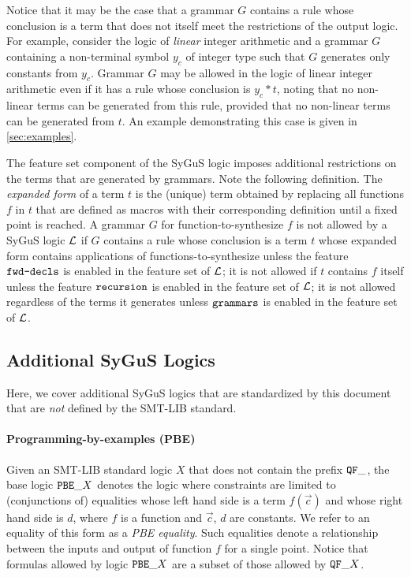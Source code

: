 \documentclass[english,a4paper,10pt]{article}
\begin{document}
Notice that it may be the case that a grammar $G$
contains a rule whose conclusion is a term 
that does not itself meet the restrictions 
of the output logic.
For example, consider the logic of \emph{linear} integer arithmetic
and a grammar $G$ containing a non-terminal symbol $y_c$ of integer type
such that $G$ generates only constants from $y_c$.
Grammar $G$ may be allowed in the logic of linear integer arithmetic
even if it has a rule whose conclusion is $y_c * t$, 
noting that no non-linear terms can be generated from this rule,
provided that no non-linear terms can be generated from $t$.
An example demonstrating this case is given in \cref{sec:examples}.

The feature set component of the SyGuS logic 
imposes additional restrictions
on the terms that are generated by grammars.
Note the following definition.
The \emph{expanded form} of a term $t$
is the (unique) term obtained
by replacing all functions $f$ in $t$ that are defined as macros
with their corresponding definition until a fixed point is reached.
A grammar $G$ for function-to-synthesize $f$ is not allowed by a SyGuS logic $\mathcal{L}$
if $G$  contains a rule whose conclusion is a term $t$
whose expanded form contains applications of functions-to-synthesize
unless the feature $\texttt{fwd-decls}$ is enabled in the feature set of $\mathcal{L}$;
it is not allowed if $t$ 
contains $f$ itself unless the feature $\texttt{recursion}$ is enabled in the feature set of $\mathcal{L}$;
it is not allowed regardless of the terms it generates unless $\texttt{grammars}$ is enabled in the feature set of $\mathcal{L}$.


\subsection{Additional SyGuS Logics}
Here, we cover additional SyGuS logics that are standardized
by this document that are \emph{not} defined by the SMT-LIB standard.

\paragraph{Programming-by-examples (PBE)}
Given an SMT-LIB standard logic $X$ 
that does not contain the prefix ${\tt QF\_}$,
the base logic ${\tt PBE\_}X$ denotes the logic
where constraints are limited to (conjunctions of)
equalities whose left hand side is a term $f( \vec c )$ and 
whose right hand side is $d$,
where $f$ is a function
and $\vec c$, $d$ are constants.
We refer to an equality of this form as a \emph{PBE equality}.
Such equalities denote a relationship between the inputs and output of 
function $f$ for a single point.
Notice that formulas allowed by 
logic ${\tt PBE\_}X$ are a subset of those allowed by ${\tt QF\_}X$.
\end{document}
